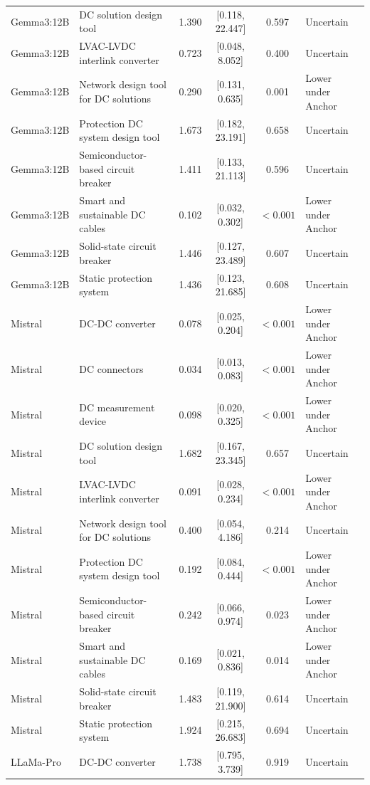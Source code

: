 \begin{longtable}[tbp]{p{2.2cm}p{5.0cm}cccp{3.2cm}}
Gemma3:12B & DC solution design tool & 1.390 & [0.118, 22.447] & 0.597 & Uncertain \\
Gemma3:12B & LVAC-LVDC interlink converter & 0.723 & [0.048, 8.052] & 0.400 & Uncertain \\
Gemma3:12B & Network design tool for DC solutions & 0.290 & [0.131, 0.635] & 0.001 & Lower under Anchor \\
Gemma3:12B & Protection DC system design tool & 1.673 & [0.182, 23.191] & 0.658 & Uncertain \\
Gemma3:12B & Semiconductor-based circuit breaker & 1.411 & [0.133, 21.113] & 0.596 & Uncertain \\
Gemma3:12B & Smart and sustainable DC cables & 0.102 & [0.032, 0.302] & $<0.001$ & Lower under Anchor \\
Gemma3:12B & Solid-state circuit breaker & 1.446 & [0.127, 23.489] & 0.607 & Uncertain \\
Gemma3:12B & Static protection system & 1.436 & [0.123, 21.685] & 0.608 & Uncertain \\
Mistral & DC-DC converter & 0.078 & [0.025, 0.204] & $<0.001$ & Lower under Anchor \\
Mistral & DC connectors & 0.034 & [0.013, 0.083] & $<0.001$ & Lower under Anchor \\
Mistral & DC measurement device & 0.098 & [0.020, 0.325] & $<0.001$ & Lower under Anchor \\
Mistral & DC solution design tool & 1.682 & [0.167, 23.345] & 0.657 & Uncertain \\
Mistral & LVAC-LVDC interlink converter & 0.091 & [0.028, 0.234] & $<0.001$ & Lower under Anchor \\
Mistral & Network design tool for DC solutions & 0.400 & [0.054, 4.186] & 0.214 & Uncertain \\
Mistral & Protection DC system design tool & 0.192 & [0.084, 0.444] & $<0.001$ & Lower under Anchor \\
Mistral & Semiconductor-based circuit breaker & 0.242 & [0.066, 0.974] & 0.023 & Lower under Anchor \\
Mistral & Smart and sustainable DC cables & 0.169 & [0.021, 0.836] & 0.014 & Lower under Anchor \\
Mistral & Solid-state circuit breaker & 1.483 & [0.119, 21.900] & 0.614 & Uncertain \\
Mistral & Static protection system & 1.924 & [0.215, 26.683] & 0.694 & Uncertain \\
LLaMa-Pro & DC-DC converter & 1.738 & [0.795, 3.739] & 0.919 & Uncertain \\

\end{longtable}
